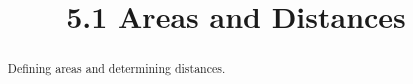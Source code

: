 \documentclass{ximera}
\title{5.1 Areas and Distances}
\begin{document}
  
\begin{abstract}  
Defining areas and determining distances.
\end{abstract}  
\maketitle  
\end{document}

